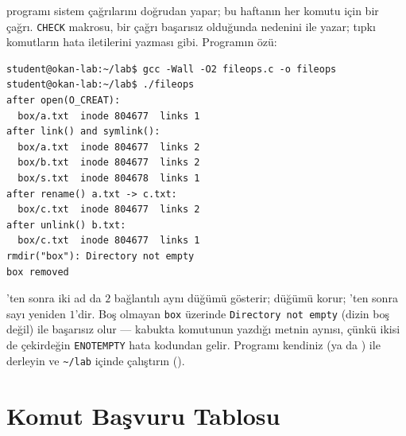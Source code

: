  programı sistem çağrılarını doğrudan yapar; bu haftanın her komutu için bir çağrı. \texttt{CHECK} makrosu, bir çağrı başarısız olduğunda nedenini  ile yazar; tıpkı komutların hata iletilerini yazması gibi. Programın özü:



\begin{lstlisting}[style=term]
student@okan-lab:~/lab$ gcc -Wall -O2 fileops.c -o fileops
student@okan-lab:~/lab$ ./fileops
after open(O_CREAT):
  box/a.txt  inode 804677  links 1
after link() and symlink():
  box/a.txt  inode 804677  links 2
  box/b.txt  inode 804677  links 2
  box/s.txt  inode 804678  links 1
after rename() a.txt -> c.txt:
  box/c.txt  inode 804677  links 2
after unlink() b.txt:
  box/c.txt  inode 804677  links 1
rmdir("box"): Directory not empty
box removed
\end{lstlisting}

'ten sonra iki ad da $2$ bağlantılı aynı düğümü gösterir;  düğümü korur; 'ten sonra sayı yeniden $1$'dir. Boş olmayan \texttt{box} üzerinde  \texttt{Directory not empty} (dizin boş değil) ile başarısız olur --- kabukta  komutunun yazdığı metnin aynısı, çünkü ikisi de çekirdeğin \texttt{ENOTEMPTY} hata kodundan gelir. Programı kendiniz  (ya da ) ile derleyin ve \texttt{\textasciitilde/lab} içinde çalıştırın ().

\section{Komut Başvuru Tablosu}

